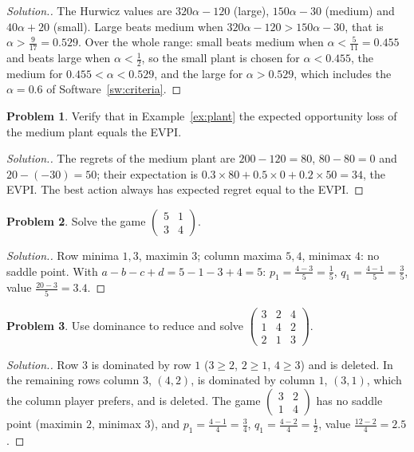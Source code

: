 \documentclass[11pt,a4paper]{article}
\numberwithin{equation}{section}
\theoremstyle{definition}
\newtheorem{problemx}{Problem}[subsection]
\newenvironment{problem}{\begin{problemx}}{\end{problemx}}
\newenvironment{solution}
  {\renewcommand{\qedsymbol}{}\begin{proof}[\textit{Solution}.]}
  {\end{proof}}
\begin{document}
\begin{solution}
The Hurwicz values are $320\alpha - 120$ (large), $150\alpha - 30$ (medium) and $40\alpha + 20$ (small). Large beats medium when $320\alpha - 120 > 150\alpha - 30$, that is $\alpha > \frac9{17} = 0.529$. Over the whole range: small beats medium when $\alpha < \frac5{11} = 0.455$ and beats large when $\alpha < \frac12$, so the small plant is chosen for
$\alpha < 0.455$, the medium for $0.455 < \alpha < 0.529$, and the large for $\alpha > 0.529$, which includes the $\alpha = 0.6$ of Software~\ref{sw:criteria}.
\end{solution}

\begin{problem}
Verify that in Example~\ref{ex:plant} the expected opportunity loss of the medium plant equals the EVPI.
\end{problem}

\begin{solution}
The regrets of the medium plant are $200 - 120 = 80$, $80 - 80 = 0$ and $20 - (-30) = 50$; their expectation is $0.3 \times 80 + 0.5 \times 0 + 0.2 \times 50 = 34$, the EVPI. The best action always has expected regret equal to the EVPI.
\end{solution}

\begin{problem}
Solve the game $\begin{pmatrix} 5 & 1 \\ 3 & 4 \end{pmatrix}$.
\end{problem}

\begin{solution}
Row minima $1, 3$, maximin $3$; column maxima $5, 4$, minimax $4$: no saddle point. With $a - b - c + d = 5 - 1 - 3 + 4 = 5$: $p_1 = \frac{4 - 3}5 = \frac15$, $q_1 = \frac{4 - 1}5 = \frac35$, value $\frac{20 - 3}5 = 3.4$.
\end{solution}

\begin{problem}
Use dominance to reduce and solve $\begin{pmatrix} 3 & 2 & 4 \\ 1 & 4 & 2 \\ 2 & 1 & 3 \end{pmatrix}$.
\end{problem}

\begin{solution}
Row $3$ is dominated by row $1$ ($3 \geq 2$, $2 \geq 1$, $4 \geq 3$) and is deleted. In the remaining rows column $3$, $(4, 2)$, is dominated by column $1$, $(3, 1)$, which the column player prefers, and is deleted. The game $\begin{pmatrix} 3 & 2 \\ 1 & 4 \end{pmatrix}$ has no saddle point (maximin $2$, minimax $3$), and
$p_1 = \frac{4 - 1}4 = \frac34$, $q_1 = \frac{4 - 2}4 = \frac12$, value $\frac{12 - 2}4 = 2.5$.
\end{solution}
\end{document}
